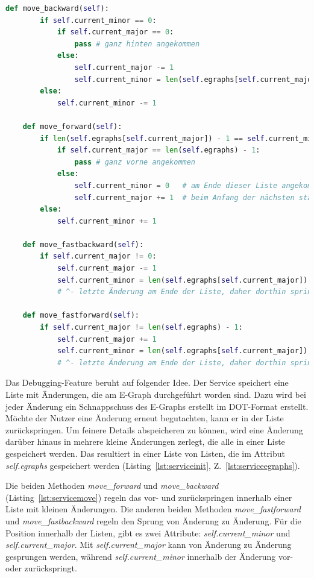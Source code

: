 \begin{lstlisting}[language=Python, escapechar=|, caption=Methoden für das Debugging aus der Datei \textit{EGraphService.py}, label={lst:servicemove}]
    def move_backward(self):
        if self.current_minor == 0:
            if self.current_major == 0:
                pass # ganz hinten angekommen
            else:
                self.current_major -= 1
                self.current_minor = len(self.egraphs[self.current_major]) - 1
        else:
            self.current_minor -= 1

    def move_forward(self):
        if len(self.egraphs[self.current_major]) - 1 == self.current_minor:
            if self.current_major == len(self.egraphs) - 1:
                pass # ganz vorne angekommen
            else:
                self.current_minor = 0   # am Ende dieser Liste angekommen,
                self.current_major += 1  # beim Anfang der nächsten starten
        else:
            self.current_minor += 1

    def move_fastbackward(self):
        if self.current_major != 0:
            self.current_major -= 1
            self.current_minor = len(self.egraphs[self.current_major]) - 1
            # ^- letzte Änderung am Ende der Liste, daher dorthin springen

    def move_fastforward(self):
        if self.current_major != len(self.egraphs) - 1:
            self.current_major += 1
            self.current_minor = len(self.egraphs[self.current_major]) - 1
            # ^- letzte Änderung am Ende der Liste, daher dorthin springen
\end{lstlisting} 

Das Debugging-Feature beruht auf folgender Idee. Der Service speichert eine Liste mit Änderungen, die am E-Graph durchgeführt worden sind.
Dazu wird bei jeder Änderung ein Schnappschuss des E-Graphs erstellt im DOT-Format erstellt.
Möchte der Nutzer eine Änderung erneut begutachten, kann er in der Liste zurückspringen. Um feinere Details abspeicheren zu können, wird 
eine Änderung darüber hinaus in mehrere kleine Änderungen zerlegt, die alle in einer Liste gespeichert werden. Das resultiert in einer Liste von Listen,
die im Attribut \textit{self.egraphs} gespeichert werden (Listing~\ref{lst:serviceinit}, Z.~\ref{lst:serviceegraphs}).

Die beiden Methoden \textit{move\_forward} und \textit{move\_backward} (Listing~\ref{lst:servicemove}) regeln das vor- und zurückspringen innerhalb einer Liste mit kleinen Änderungen.
Die anderen beiden Methoden \textit{move\_fastforward} und \textit{move\_fastbackward} regeln den Sprung von Änderung zu Änderung.
Für die Position innerhalb der Listen, gibt es zwei Attribute: \textit{self.current\_minor} und \textit{self.current\_major}. Mit \textit{self.current\_major} kann von Änderung
zu Änderung gesprungen werden, während \textit{self.current\_minor} innerhalb der Änderung vor- oder zurückspringt.


